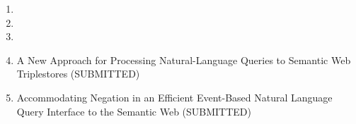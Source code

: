 \documentclass[fleqn, oneside, 12pt]{book}
\theoremstyle{definitionsty}
\begin{document}



\begin{enumerate}
    \item {}

    \item {}

    \item {}

    \item A New Approach for Processing Natural-Language Queries to Semantic Web Triplestores (SUBMITTED) %

    \item Accommodating Negation in an Efficient Event-Based Natural Language Query Interface to the Semantic Web (SUBMITTED) %
\end{enumerate}
\end{document}
